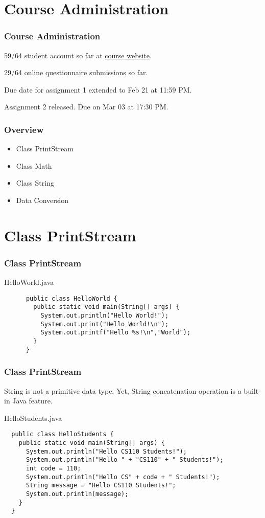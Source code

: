 \documentclass[10pt, compress]{beamer}
\begin{document}
\prepareCover

\section{Course Administration}

\begin{frame}[fragile]
\frametitle{Course Administration}
  59/64 student account so far at \href{http://ghorbanzade.com/}{course website}.

  29/64 online questionnaire submissions so far.

  Due date for assignment 1 extended to Feb 21 at 11:59 PM.

  Assignment 2 released. Due on Mar 03 at 17:30 PM.
\end{frame}

\begin{frame}[fragile]
  \frametitle{Overview}
  \begin{itemize}
    \item[] Class PrintStream
    \item[] Class Math
    \item[] Class String
    \item[] Data Conversion
  \end{itemize}
\end{frame}

\section{Class PrintStream}

\begin{frame}[fragile]
  \frametitle{Class PrintStream}
  \begin{block}{HelloWorld.java}
    \begin{verbatim}
      public class HelloWorld {
        public static void main(String[] args) {
          System.out.println("Hello World!");
          System.out.print("Hello World!\n");
          System.out.printf("Hello %s!\n","World");
        }
      }
    \end{verbatim}
  \end{block}
\end{frame}

\begin{frame}[fragile]
  \frametitle{Class PrintStream}
  String is not a primitive data type. Yet, String concatenation operation is a built-in Java feature.
  \begin{block}{HelloStudents.java}
  \begin{verbatim}
  public class HelloStudents {
    public static void main(String[] args) {
      System.out.println("Hello CS110 Students!");
      System.out.println("Hello " + "CS110" + " Students!");
      int code = 110;
      System.out.println("Hello CS" + code + " Students!");
      String message = "Hello CS110 Students!";
      System.out.println(message);
    }
  }
  \end{verbatim}
  \end{block}
\end{frame}
\end{document}
